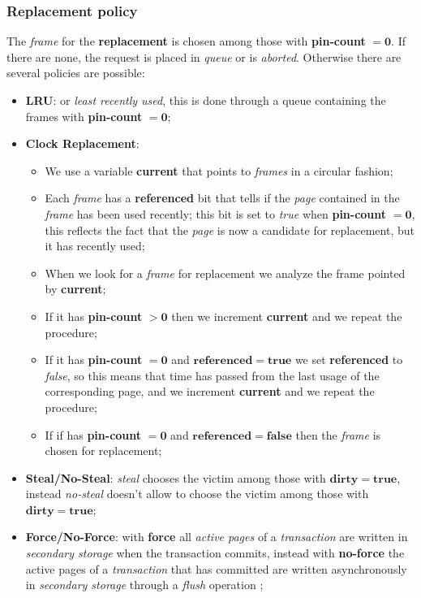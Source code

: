 \documentclass{article}
\begin{document}
\subsubsection{Replacement policy}
The \emph{frame} for the \textbf{replacement} is chosen among those with \textbf{pin-count }$\mathbf{=0}$. If there are none, the request is placed in \emph{queue} or is \emph{aborted}. Otherwise there are several policies are possible:
\begin{itemize}
\item \textbf{LRU}: or \emph{least recently used}, this is done through a queue containing the frames with \textbf{pin-count }$\mathbf{=0}$;
\item \textbf{Clock Replacement}:
\begin{itemize}
\item We use a variable \textbf{current} that points to \emph{frames} in a circular fashion;
\item Each \emph{frame} has a \textbf{referenced} bit that tells if the \emph{page} contained in the \emph{frame} has been used recently; this bit is set to \emph{true} when \textbf{pin-count }$\mathbf{=0}$, this reflects the fact that the \emph{page} is now a candidate for replacement, but it has recently used;
\item When we look for a \emph{frame} for replacement we analyze the frame pointed by \textbf{current};
\item If it has \textbf{pin-count }$\mathbf{>0}$ then we increment \textbf{current} and we repeat the procedure;
\item If it has \textbf{pin-count }$\mathbf{=0}$ and $\mathbf{referenced = true}$ we set \textbf{referenced} to \emph{false}, so this means that time has passed from the last usage of the corresponding page, and we increment \textbf{current} and we repeat the procedure;
\item If if has \textbf{pin-count }$\mathbf{=0}$ and $\mathbf{referenced = false}$ then the \emph{frame} is chosen for replacement;
\end{itemize}
\item \textbf{Steal/No-Steal}: \emph{steal} chooses the victim among those with $\mathbf{dirty = true}$, instead \emph{no-steal} doesn't allow to choose the victim among those with $\mathbf{dirty = true}$;
\item \textbf{Force/No-Force}: with \textbf{force} all \emph{active pages} of a \emph{transaction} are written in \emph{secondary storage} when the transaction commits, instead with \textbf{no-force} the active pages of a \emph{transaction} that has committed are written asynchronously in \emph{secondary storage} through a \emph{flush} operation ;
\end{itemize}
\end{document}
